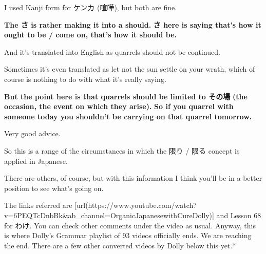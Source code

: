 {}

I used Kanji form for ケンカ (喧嘩), but both are fine.

{\bf The さ is rather making it into a should.} {\bf さ here is saying that's how it ought to be / come on, that's how it should be.}

And it's translated into English as quarrels should not be continued.

{}

Sometimes it's even translated as let not the sun settle on your wrath, which of course is nothing to do with what it's really saying.

{\bf But the point here is that quarrels should be limited to その場} {\bf (the occasion, the event on which they arise).} {\bf So if you quarrel with someone today you shouldn't be carrying on that quarrel tomorrow.}

Very good advice.

So this is a range of the circumstances in which the 限り / 限る concept is applied in Japanese.

{}

There are others, of course, but with this information I think you'll be in a better position to see what's going on.

{}

{}

{}

The links referred are [url(https://www.youtube.com/watch?v=6PEQTcDnbBk&ab_channel=OrganicJapanesewithCureDolly)] and Lesson 68 for わけ. You can check other comments under the video as usual. Anyway, this is where Dolly's Grammar playlist of 93 videos officially ends. We are reaching the end. There are a few other converted videos by Dolly below this yet.*

\stopsectionlevel

\stopsectionlevel

\stopsectionlevel
